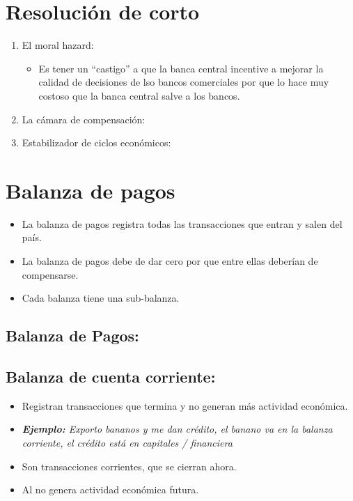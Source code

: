 \section{Resolución de corto}
\begin{enumerate}
    \item El moral hazard:
        \begin{itemize}
            \item Es tener un ``castigo'' a que la banca central incentive a mejorar la calidad de decisiones de lso bancos comerciales por que lo hace muy costoso que la banca central salve a los bancos.
        \end{itemize}
    
    \item La cámara de compensación: 
    \item Estabilizador de ciclos económicos: 
\end{enumerate}

\section{Balanza de pagos}
\begin{itemize}
    \item La balanza de pagos registra todas las transacciones que entran y salen del país.
    \item La balanza de pagos debe de dar cero por que entre ellas deberían de compensarse.
    \item Cada balanza tiene una sub-balanza.
\end{itemize}


\subsection{Balanza de Pagos:}    
\subsection{Balanza de cuenta corriente:}
\begin{itemize}
    \item Registran transacciones que termina y no generan más actividad económica.
    \item \emph{\textbf{Ejemplo: }Exporto bananos y me dan crédito, el banano va en la balanza corriente, el crédito está en capitales / financiera}
    \item Son transacciones corrientes, que se cierran ahora.
    \item Al no genera actividad económica futura.
\end{itemize}

